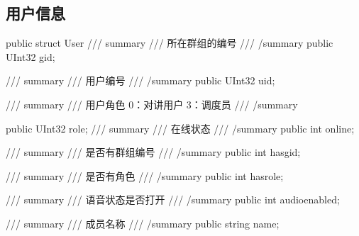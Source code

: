 \documentclass[letterpaper,10pt,english]{sphinxmanual}
\begin{document}
\subsection{用户信息}
\label{\detokenize{csharp:id87}}
%
\begin{sphinxVerbatim}[commandchars=\\\{\}]
public struct User
\PYGZob{}
  /// \PYGZlt{}summary\PYGZgt{}
  /// 所在群组的编号
  /// \PYGZlt{}/summary\PYGZgt{}
  public UInt32 gid;

  /// \PYGZlt{}summary\PYGZgt{}
  /// 用户编号
  /// \PYGZlt{}/summary\PYGZgt{}
  public UInt32 uid;

  /// \PYGZlt{}summary\PYGZgt{}
  /// 用户角色 0：对讲用户 3：调度员
  /// \PYGZlt{}/summary\PYGZgt{}

  public UInt32 role;
  /// \PYGZlt{}summary\PYGZgt{}
  /// 在线状态
  /// \PYGZlt{}/summary\PYGZgt{}
  public int online;

  /// \PYGZlt{}summary\PYGZgt{}
  /// 是否有群组编号
  /// \PYGZlt{}/summary\PYGZgt{}
  public int has\PYGZus{}gid;

  /// \PYGZlt{}summary\PYGZgt{}
  /// 是否有角色
  /// \PYGZlt{}/summary\PYGZgt{}
  public int has\PYGZus{}role;

  /// \PYGZlt{}summary\PYGZgt{}
  /// 语音状态是否打开
  /// \PYGZlt{}/summary\PYGZgt{}
  public int audio\PYGZus{}enabled;

  /// \PYGZlt{}summary\PYGZgt{}
  /// 成员名称
  /// \PYGZlt{}/summary\PYGZgt{}
  public string name;
\PYGZcb{}
\end{sphinxVerbatim}
\end{document}
